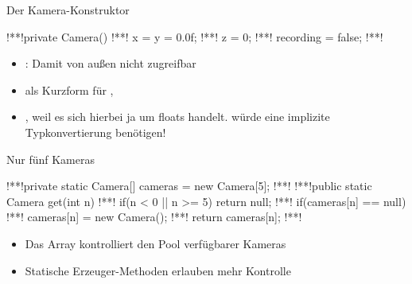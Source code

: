 \SidebarSolution
\begin{frame}[fragile,c]{Der Kamera-Konstruktor}
\begin{plainjava}
!**!private Camera() {
!**!   x = y = 0.0f;
!**!   z = 0;
!**!   recording = false;
!**!}
\end{plainjava}\medskip
\begin{itemize}
   \item<6-> : Damit von außen nicht zugreifbar
   \item<7->  als Kurzform für ,  
   \item<9-> , weil es sich hierbei ja um floats handelt.  würde eine implizite Typkonvertierung benötigen!
\end{itemize}
%
\end{frame}

\begin{frame}[fragile,c]{Nur fünf Kameras}
\begin{plainjava}
!**!private static Camera[] cameras = new Camera[5];
!**!
!**!public static Camera get(int n) {
!**!   if(n < 0 || n >= 5) return null;
!**!   if(cameras[n] == null)
!**!      cameras[n] = new Camera();
!**!   return cameras[n];
!**!}
\end{plainjava}
\bigskip
\begin{itemize}
   \itemsep6pt
   \item<7-> Das Array kontrolliert den Pool verfügbarer Kameras
   \item<8-> Statische Erzeuger-Methoden erlauben mehr Kontrolle
\end{itemize}
\end{frame}
\SidebarReset

